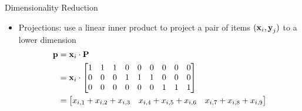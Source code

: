 \begin{frame}{Dimensionality Reduction}
    \begin{itemize}
        \item Projections: use a linear inner product to project a pair of items $(\boldsymbol{\mathbf{x}}_i, \boldsymbol{\mathbf{y}}_j)$ to a lower dimension
        \begin{equation} \label{eq:proj}
            \begin{split}
                \boldsymbol{\mathbf{p}} 
                &= 
                    \boldsymbol{\mathbf{x}}_{i} \cdot \boldsymbol{\mathbf{P}} \\
                &=
                    \boldsymbol{\mathbf{x}}_{i} \cdot
                    \begin{bmatrix}
                        1 & 1 & 1 & 0 & 0 & 0 & 0 & 0 & 0 \\
                        0 & 0 & 0 & 1 & 1 & 1 & 0 & 0 & 0 \\
                        0 & 0 & 0 & 0 & 0 & 0 & 1 & 1 & 1 \\
                    \end{bmatrix} \\  
                &=
                    \begin{bmatrix}
                        x_{i,1} + x_{i,2} + x_{i,3} & x_{i,4} + x_{i,5} + x_{i,6} & x_{i,7} + x_{i,8} + x_{i,9}
                    \end{bmatrix} \\
            \end{split}
        \end{equation}
    \end{itemize}
\end{frame}

